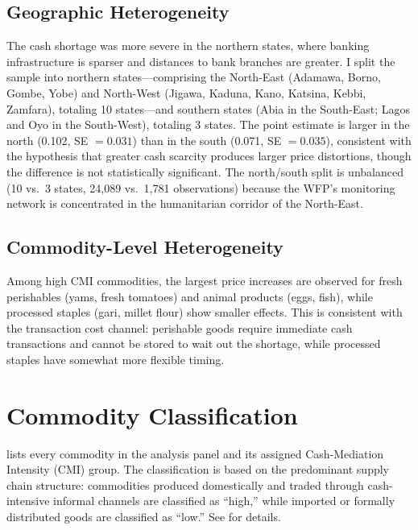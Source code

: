 \documentclass[12pt]{article}
\begin{document}
\subsection{Geographic Heterogeneity}

The cash shortage was more severe in the northern states, where banking infrastructure is sparser and distances to bank branches are greater. I split the sample into northern states---comprising the North-East (Adamawa, Borno, Gombe, Yobe) and North-West (Jigawa, Kaduna, Kano, Katsina, Kebbi, Zamfara), totaling 10 states---and southern states (Abia in the South-East; Lagos and Oyo in the South-West), totaling 3 states. The point estimate is larger in the north (0.102, SE $= 0.031$) than in the south (0.071, SE $= 0.035$), consistent with the hypothesis that greater cash scarcity produces larger price distortions, though the difference is not statistically significant. The north/south split is unbalanced (10 vs.\ 3 states, 24,089 vs.\ 1,781 observations) because the WFP's monitoring network is concentrated in the humanitarian corridor of the North-East.

\subsection{Commodity-Level Heterogeneity}

Among high CMI commodities, the largest price increases are observed for fresh perishables (yams, fresh tomatoes) and animal products (eggs, fish), while processed staples (gari, millet flour) show smaller effects. This is consistent with the transaction cost channel: perishable goods require immediate cash transactions and cannot be stored to wait out the shortage, while processed staples have somewhat more flexible timing.


\section{Commodity Classification}
\label{app:commodity_list}

 lists every commodity in the analysis panel and its assigned Cash-Mediation Intensity (CMI) group. The classification is based on the predominant supply chain structure: commodities produced domestically and traded through cash-intensive informal channels are classified as ``high,'' while imported or formally distributed goods are classified as ``low.'' See  for details.
\end{document}
